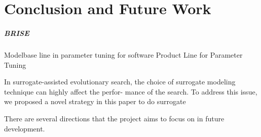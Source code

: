 \chapter{Conclusion and Future Work}\label{sec:conclusion}



         \paragraph{BRISE}
         Modelbase line in parameter tuning for software Product Line for Parameter Tuning




         In surrogate-assisted evolutionary search, the choice of surrogate modeling technique can highly affect the perfor- mance of the search. To address this issue, we proposed a novel strategy in this paper to do surrogate


         There are several directions that the project aims to focus on in future development. 